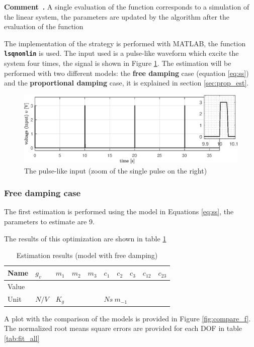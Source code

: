 \documentclass[twosided,a4paper]{article}           %
\newcounter{comment}[section]
\newenvironment{comment}[1][]{\refstepcounter{comment}\par\medskip
	\noindent \textbf{Comment~\thecomment. #1} }{\par}
\begin{document}
\begin{comment}
	A single evaluation of the function corresponds to a simulation of the linear system, the parameters are updated by the algorithm after the evaluation of the function\\
\end{comment}
\noindent The implementation of the strategy is performed with MATLAB, the function \texttt{\textbf{lsqnonlin}} is used. The input used is a pulse-like waveform which excite the system four times, the 
signal is shown in Figure \ref{fig:pulse_input}. The estimation will be performed with two different models: the \textbf{free damping} case (equation \eqref{eq:ss}) and the \textbf{proportional damping} case, it is explained in section \ref{sec:prop_est}.
\begin{figure}
	\centering
	\includegraphics[width=\linewidth]{img/pulse_input}
	\caption{The pulse-like input (zoom of the single pulse on the right)}
	\label{fig:pulse_input}
\end{figure}


\subsubsection{Free damping case}
The first estimation is performed using the model in Equations \eqref{eq:ss}, the parameters to estimate are 9.

The results of this optimization are shown in table \ref{tab:est_full_results}
\begin{table}[H]
	
	\centering
	\begin{tabular}{|l|l|l|l|l|l|l|l|l|l|}
		\hline
		Name & $g_v$ &  $m_1$ & $m_2$ & $m_3$  &  $c_1$ & $c_2$ & $c_3$  & $c_{12}$ & $c_{23}$ \\
		\hline
		Value &  &  &  &  &  &  &  &  &  \\ 
		\hline
		Unit & $N/V$ &  \multicolumn{3}{l|}{$K_g$}  &  \multicolumn{5}{l|}{$Ns \ m_{-1}$} \\
		\hline
\end{tabular}
\caption{Estimation results (model with free damping)}
\label{tab:est_full_results}
\end{table}
A plot with the comparison of the models is provided in Figure \ref{fig:compare_f}. The normalized root means square errors are provided for each DOF in table \ref{tab:fit_all}
\end{document}
